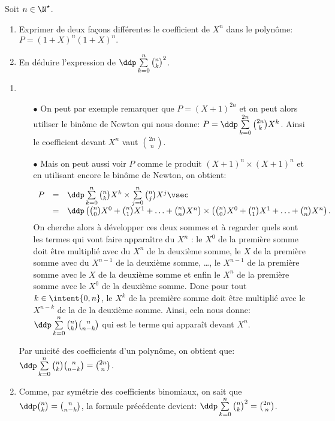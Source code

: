 \documentclass[a4paper, 11pt,reqno]{article}
\begin{document}
\begin{exercice}  \;
	Soit $n\in\N^{\star}$.
	\begin{enumerate}
		\item Exprimer de deux fa\c{c}ons diff\'erentes le coefficient de $X^n$ dans le polyn\^ome: $P=(1+X)^n(1+X)^n.$
		\item En d\'eduire l'expression de $\ddp \sum\limits_{k=0}^n \binom{n}{k}^2$.
	\end{enumerate}
\end{exercice}
\begin{correction}  \;
	\begin{enumerate}
		\item
		      \begin{itemize}
			      \item[$\bullet$] On peut par exemple remarquer que $P=(X+1)^{2n}$ et on peut alors utiliser le bin\^{o}me de Newton qui nous donne: $P=\ddp\sum\limits_{k=0}^{2n} \binom{2n}{k} X^k$. Ainsi le coefficient devant $X^n$ vaut $\binom{2n}{n}$.
			      \item[$\bullet$] Mais on peut aussi voir $P$ comme le produit $(X+1)^n\times (X+1)^n$ et en utilisant encore le bin\^{o}me de Newton, on obtient:
			            $$\begin{array}{rcl}
					            P & = & \ddp\sum\limits_{k=0}^{n} \binom{n}{k} X^k\times \sum\limits_{j=0}^{n} \binom{n}{j} X^j \vsec                                                                            \\
					              & = & \ddp \left( \binom{n}{0} X^0 + \binom{n}{1} X^1 + \ldots + \binom{n}{n}X^n \right) \times \left( \binom{n}{0} X^0 + \binom{n}{1} X^1 + \ldots + \binom{n}{n}X^n \right).
				            \end{array}$$
			            On cherche alors \`{a} d\'evelopper ces deux sommes et \`{a} regarder quels sont les termes qui vont faire appara\^{i}tre du $X^n$ : le $X^0$ de la premi\`{e}re somme doit \^{e}tre multipli\'e avec du $X^n$ de la deuxi\`{e}me somme, le $X$ de la premi\`{e}re somme avec du $X^{n-1}$ de la deuxi\`{e}me somme, \dots, le $X^{n-1}$ de la premi\`{e}re somme avec le $X$ de la deuxi\`{e}me somme et enfin le $X^n$ de la premi\`{e}re somme avec le $X^0$ de la deuxi\`{e}me somme. Donc pour tout $k\in\intent{ 0,n}$, le $X^k$ de la premi\`{e}re somme doit \^{e}tre
			            multipli\'e avec le $X^{n-k}$ de la de la deuxi\`{e}me somme.
			            Ainsi, cela nous donne: $\ddp\sum\limits_{k=0}^n \binom{n}{k}\binom{n}{n-k}$ qui est le terme qui appara\^{i}t devant $X^n$.
		      \end{itemize}
		      Par unicit\'e des coefficients d'un polyn\^{o}me, on obtient que: $\ddp\sum\limits_{k=0}^n \binom{n}{k}\binom{n}{n-k}=\binom{2n}{n}$.
		\item Comme, par sym\'etrie des coefficients binomiaux, on sait que $\ddp\binom{n}{k}=\binom{n}{n-k}$, la formule pr\'ec\'edente devient: $\ddp\sum\limits_{k=0}^n \binom{n}{k}^2=\binom{2n}{n}$.
	\end{enumerate}
\end{correction}
\end{document}
